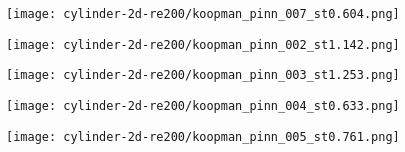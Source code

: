 \begin{figure*} 
    \centering%
    \texttt{[image: cylinder-2d-re200/koopman\_pinn\_007\_st0.604.png]}%
    \caption{%
        The \num{4}th primary mode in data-driven PINN.
    }
    \label{fig:cylinder-re200-koopman-pinn-primary-4th}%
\end{figure*}

\begin{figure*} 
    \centering%
    \texttt{[image: cylinder-2d-re200/koopman\_pinn\_002\_st1.142.png]}%
    \caption{%
        The \num{1}st damped mode in data-driven PINN.
    }
    \label{fig:cylinder-re200-koopman-pinn-damped-1st}%
\end{figure*}

\begin{figure*} 
    \centering%
    \texttt{[image: cylinder-2d-re200/koopman\_pinn\_003\_st1.253.png]}%
    \caption{%
        The \num{2}nd damped mode in data-driven PINN.
    }
    \label{fig:cylinder-re200-koopman-pinn-damped-2nd}%
\end{figure*}

\begin{figure*} 
    \centering%
    \texttt{[image: cylinder-2d-re200/koopman\_pinn\_004\_st0.633.png]}%
    \caption{%
        The \num{3}rd damped mode in data-driven PINN.
    }
    \label{fig:cylinder-re200-koopman-pinn-damped-3rd}%
\end{figure*}

\begin{figure*} 
    \centering%
    \texttt{[image: cylinder-2d-re200/koopman\_pinn\_005\_st0.761.png]}%
    \caption{%
        The \num{4}th damped mode in data-driven PINN.
    }
    \label{fig:cylinder-re200-koopman-pinn-damped-4th}%
\end{figure*}

